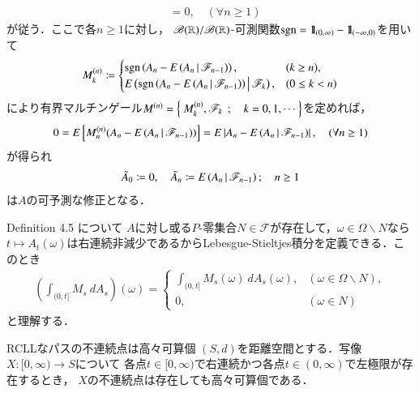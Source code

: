 \begin{prf}
\begin{align}
			&= 0,
			\quad (\forall n \geq 1)
		\end{align}
		が従う．ここで各$n \geq 1$に対し，
		$\mathscr{B}(\mathbb{R})/\mathscr{B}(\mathbb{R})$-可測関数$\operatorname{sgn} = \mbox{1}\hspace{-0.25em}\mbox{l}_{(0,\infty)} - \mbox{1}\hspace{-0.25em}\mbox{l}_{(-\infty,0)}$を用いて
		\begin{align}
			M^{(n)}_k \coloneqq 
			\begin{cases}
				\operatorname{sgn}\left( A_n - E\left( A_n \, \middle|\, \mathscr{F}_{n-1} \right) \right), & (k \geq n), \\
				E\left( \operatorname{sgn}\left( A_n - E\left( A_n \, \middle|\, \mathscr{F}_{n-1} \right) \right) \, \middle|\, \mathscr{F}_k \right), & (0 \leq k < n)
			\end{cases}
		\end{align}
		により有界マルチンゲール$M^{(n)} = \left\{\ M^{(n)}_k,\mathscr{F}_k\ \, ; \quad k=0,1,\cdots\ \right\}$を定めれば，
		\begin{align}
			0 = E\left[ M^{(n)}_n(A_n - E\left( A_n \, \middle|\, \mathscr{F}_{n-1} \right)) \right] 
			= E\left| A_n - E\left( A_n \, \middle|\, \mathscr{F}_{n-1} \right) \right|,
			\quad (\forall n \geq 1)
		\end{align}
		が得られ
		\begin{align}
			\tilde{A}_0 \coloneqq 0,
			\quad \tilde{A}_n \coloneqq E\left( A_n \, \middle|\, \mathscr{F}_{n-1} \right); \quad n \geq 1
		\end{align}
		は$A$の可予測な修正となる．
		\QED
	\end{prf}
	
	\begin{itembox}[l]{Definition 4.5 について}
		$A$に対し或る$P$-零集合$N \in \mathscr{F}$が存在して，$\omega \in \Omega \backslash N$なら
		$t \longmapsto A_t(\omega)$は右連続非減少であるからLebesgue-Stieltjes積分を定義できる．このとき
		\begin{align}
			\left( \int_{(0,t]} M_s\ dA_s \right)(\omega)
			= \begin{cases}
				\displaystyle\int_{(0,t]} M_s(\omega)\ dA_s(\omega), & (\omega \in \Omega \backslash N), \\
				0, & (\omega \in N)
			\end{cases}
		\end{align}
		と理解する．
	\end{itembox}
	
	\begin{itembox}[l]{RCLLなパスの不連続点は高々可算個}
		$(S,d)$を距離空間とする．写像$X:[0,\infty) \longrightarrow S$について
		各点$t \in [0,\infty)$で右連続かつ各点$t \in (0,\infty)$で左極限が存在するとき，
		$X$の不連続点は存在しても高々可算個である．
	\end{itembox}
	
